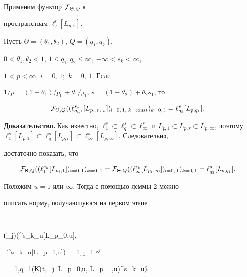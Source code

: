 Применим функтор ${\cal F}_{\Theta, Q}$ к


пространствам $\ell^s_q[L_{p,r}]$.





\begin{lem}


Пусть $\Theta =(\theta_1, \theta_2)$, $Q=(q_1,q_2)$,


$0<\theta_1, \theta_2<1$, $1\le q_1,q_2\le \infty$, $-\infty <s_k<\infty$,


$1<p<\infty$, $i=0,\,1;$ $k=0,\,1$. Если


$1/p=(1-\theta_1)/p_0+\theta_1/p_1$, $s=(1-\theta_2)+\theta_2s_1$, то


$$


{\cal F}_{\Theta,


Q}((\ell^{s_k}_{q_{i,k}}[L_{p_i,r_{i,k}}])_{i=0,\,1,\; k=\const})_{k=0,\,


1}= \ell^s_{q_2}[L_{p,q_1}].


$$


\end{lem}





{\bf Доказательство.} Как известно, $\ell^s_1 \subset \ell^s_q


\subset \ell^s_{\infty }$ и $L_{p,1} \subset L_{p,r} \subset L_{p,


\infty}$, поэтому $\ell^s_1[L_{p,1}]\subset \ell^s_q[L_{p,r}]


\subset \ell^s_{\infty}[L_{p, \infty }]$. Следовательно,


достаточно показать, что


$$


{\cal F}_{\Theta,Q}((\ell^{s_k}_1[L_{p_i,1}])_{i=0,\,1})_{k=0,\,1}=


{\cal F}_{\Theta,Q}((\ell^{s_k}_{\infty


}[L_{p_i,\infty}])_{i=0,\,1})_{k=0,\,1}=


\ell^s_{q_2}[L_{p,q_1}].


$$


Положим $u=1$ или $\infty$. Тогда с помощью леммы 2 можно


описать норму, получающуюся на первом этапе


$$


\| (\psi_j)\mid(\ell^{s_k}_u[L_{p_0,u}],


\ \ell^{s_k}_u[L_{p_1,u}])_{\theta_1,q_1} \| \sim


\Phi_{\theta_1,q_1}(\|K(t,\psi_j, L_{p_0,u}, L_{p_1,u})\mid\ell^{s_k}_u\|).


